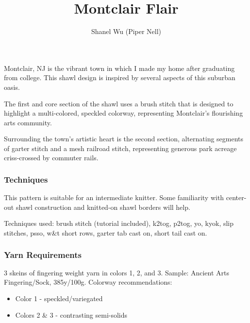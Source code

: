\documentclass[12pt]{article}
\title{Montclair Flair}
\author{Shanel Wu (Piper Nell)}
\begin{document}

{\selectfont
\HUGE\textbf{\thetitle}
\hspace{4em}\normalsize\theauthor
}

\begin{multicols}{2}

\small

\vspace{1em}

Montclair, NJ is the vibrant town in which I made my home after graduating from college. This shawl design is inspired by several aspects of this suburban oasis. 

\vspace{1em}
The first and core section of the shawl uses a brush stitch that is designed to highlight a multi-colored, speckled colorway, representing Montclair's flourishing arts community. 

\vspace{1em}
Surrounding the town's artistic heart is the second section, alternating segments of garter stitch and a mesh railroad stitch, representing generous park acreage criss-crossed by commuter rails.


\subsubsection*{Techniques}

This pattern is suitable for an intermediate knitter. %
Some familiarity with center-out shawl construction and knitted-on shawl borders will help.

Techniques used: brush stitch (tutorial included), k2tog, p2tog, yo, kyok, slip stitches, psso, w\&t short rows, garter tab cast on, short tail cast on.

\vfill
\columnbreak

\subsubsection*{Yarn Requirements}

3 skeins of fingering weight yarn in colors 1, 2, and 3. Sample: Ancient Arts Fingering/Sock, 385y/100g. Colorway recommendations:
\begin{itemize}[itemsep=0mm]
\item Color 1 - speckled/variegated
\item Colors 2 \& 3 - contrasting semi-solids
\end{itemize}


\end{multicols}
\end{document}
